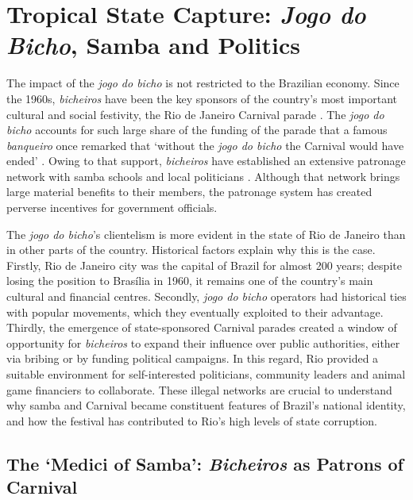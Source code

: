 \section{Tropical State Capture: \emph{Jogo do Bicho}, Samba and Politics}
\label{sec:capture}

The impact of the \emph{jogo do bicho} is not restricted to the Brazilian economy. Since the 1960s, \emph{bicheiros} have been the key sponsors of the country's most important cultural and social festivity, the Rio de Janeiro Carnival parade \citep{bezerra2009mecenato,cavalcanti2006carnaval,chinelli1993vazio,queiroz1992carnaval}. The \emph{jogo do bicho} accounts for such large share of the funding of the parade that a famous \emph{banqueiro} once remarked that `without the \emph{jogo do bicho} the Carnival would have ended' \citep{odia2016aniz}. Owing to that support, \emph{bicheiros} have established an extensive patronage network with samba schools and local politicians \citetext{\citealp[4641]{arguello2012criminalizaccao}; \citealp{congressoemfoco2007bicho}; \citealp{jornaldobrasil2011bicho}; \citealp[16]{misse2011crime}}. Although that network brings large material benefits to their members, the patronage system has created perverse incentives for government officials.

The \emph{jogo do bicho}'s clientelism is more evident in the state of Rio de Janeiro than in other parts of the country. Historical factors explain why this is the case. Firstly, Rio de Janeiro city was the capital of Brazil for almost 200 years; despite losing the position to Brasília in 1960, it remains one of the country's main cultural and financial centres. Secondly, \emph{jogo do bicho} operators had historical ties with popular movements, which they eventually exploited to their advantage. Thirdly, the emergence of state-sponsored Carnival parades created a window of opportunity for \emph{bicheiros} to expand their influence over public authorities, either via bribing or by funding political campaigns. In this regard, Rio provided a suitable environment for self-interested politicians, community leaders and animal game financiers to collaborate. These illegal networks are crucial to understand why samba and Carnival became constituent features of Brazil's national identity, and how the festival has contributed to Rio's high levels of state corruption.

\subsection{The `Medici of Samba': \emph{Bicheiros} as Patrons of Carnival}
\label{sub:patrons}

